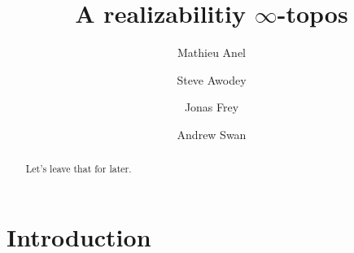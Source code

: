 




\title{A realizabilitiy $\infty$-topos}
\author{Mathieu Anel \and Steve Awodey \and Jonas Frey \and Andrew Swan}



\maketitle
\begin{abstract}
    Let's leave that for later.
\end{abstract}

% 

\section*{Introduction}







\nocite{hjp80,lurie2009higher}
\printbibliography

